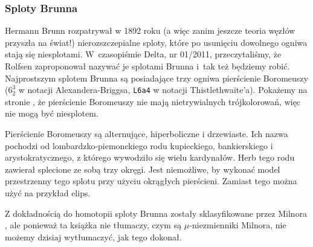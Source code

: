 
\subsubsection{Sploty Brunna}
%
Hermann Brunn \cite{brunn1892} rozpatrywał w 1892 roku (a więc zanim jeszcze teoria węzłów przyszła na świat!) nierozszczepialne sploty, które po usunięciu dowolnego ogniwa stają się niesplotami.
%
W~czasopiśmie Delta, nr 01/2011, przeczytaliśmy, że Rolfsen zaproponował nazywać je splotami Brunna i~tak też będziemy robić.
Najprostszym splotem Brunna są posiadające trzy ogniwa pierścienie Boromeuszy ($6_2^3$ w notacji Alexandera-Briggsa, \texttt{L6a4} w notacji Thistlethwaite'a).
%
Pokażemy na stronie \pageref{boromean_not_splittable}, że pierścienie Boromeuszy nie mają nietrywialnych trójkolorowań, więc nie mogą być niesplotem.

Pierścienie Boromeuszy są alternujące, hiperboliczne i drzewiaste.
%
%
%
Ich nazwa pochodzi od lombardzko-piemonckiego rodu kupieckiego, bankierskiego i arystokratycznego, z którego wywodziło się wielu kardynałów.
Herb tego rodu zawierał splecione ze sobą trzy okręgi.
Jest niemożliwe, by wykonać model przestrzenny tego splotu przy użyciu okrągłych pierścieni.
Zamiast tego można użyć na przykład elips.

Z dokładnością do homotopii sploty Brunna zostały sklasyfikowane przez Milnora \cite{milnor1954}, ale ponieważ ta książka nie tłumaczy, czym są $\mu$-niezmienniki Milnora, nie możemy dzisiaj wytłumaczyć, jak tego dokonał.
%
%

